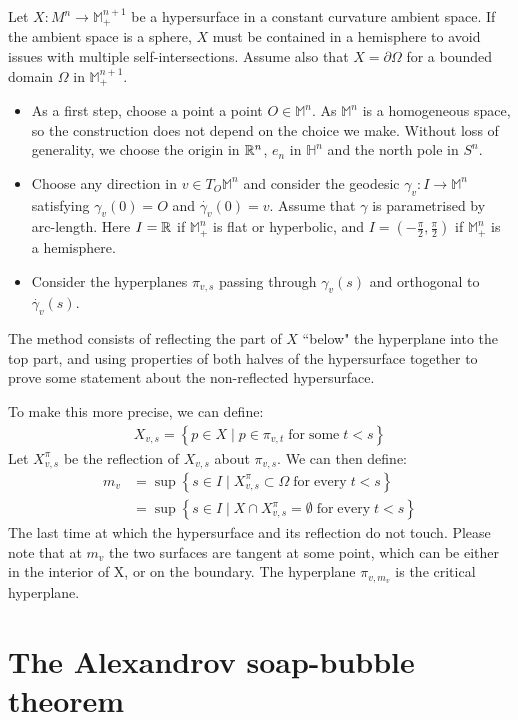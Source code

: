 Let $X:M^n\rightarrow \mathbb{M}^{n+1}_+$ be a hypersurface in a constant curvature ambient space. If the ambient space is a sphere, $X$ must be contained in a hemisphere to avoid issues with multiple self-intersections. Assume also that $X=\partial\Omega$ for a bounded domain $\Omega$ in $\mathbb{M}^{n+1}_+$. 
\begin{itemize}	
	\item As a first step, choose a point a point $O \in \mathbb{M}^n$. As $\mathbb{M}^n$ is a homogeneous space, so the construction does not depend on the choice we make. Without loss of generality, we choose the origin in $\mathbb{R}^n$, $e_n$ in $\mathbb{H}^n$ and the north pole in $S^n$. 
	\item Choose any direction in $v\in T_O\mathbb{M}^n$ and consider the geodesic $\gamma_v: I \rightarrow \mathbb{M}^n$ satisfying $\gamma_v (0) = O$ and $\dot{\gamma_v} (0) = v$. Assume that $\gamma$ is parametrised by arc-length. Here $I=\mathbb{R}$ if $\mathbb{M}^n_+$ is flat or hyperbolic, and  $I=(-\frac{\pi}{2}, \frac{\pi}{2})$ if $\mathbb{M}^n_+$ is a hemisphere.
	\item Consider the hyperplanes $\pi_{v, s}$ passing through $\gamma_v(s)$ and orthogonal to  $\dot{\gamma_v}(s)$.
\end{itemize}
The method consists of reflecting the part of $X$ ``below" the hyperplane into the top part, and using properties of both halves of the hypersurface together to prove some statement about the non-reflected hypersurface. 

To make this more precise, we can define: 
\begin{align*}
	X_{v, s} = \left\{p \in X \;|\; p\in \pi_{v, t} \; \mathrm{ for \; some }\; t < s\right\}
\end{align*}
Let $X_{v, s}^\pi$ be the reflection of $X_{v, s}$ about $\pi_{v, s}$. We can then define: 
\begin{align*}
m_v &= \sup\left\{s \in I \;|\; X_{v, s}^\pi \subset \Omega \; \mathrm{ for \; every }\; t < s \right\}\\
 &= \sup\left\{s \in I \;|\; X \cap X_{v, s}^\pi =\emptyset \; \mathrm{ for \; every }\; t < s \right\}
\end{align*}
The last time at which the hypersurface and its reflection do not touch. Please note that at $m_v$ the two surfaces are tangent at some point, which can be either in the interior of X, or on the boundary. The hyperplane $\pi_{v, m_v}$ is the critical hyperplane. 

\section{The Alexandrov soap-bubble theorem}

